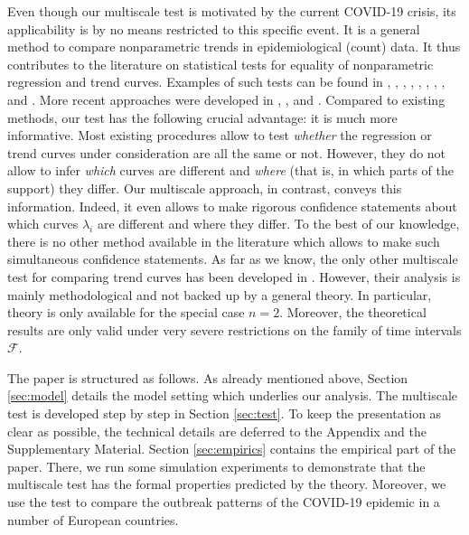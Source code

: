 \documentclass[a4paper,12pt]{article}
\numberwithin{equation}{section}
\begin{document}
Even though our multiscale test is motivated by the current COVID-19 crisis, its applicability is by no means restricted to this specific event. It is a general method to compare nonparametric trends in epidemiological (count) data. It thus contributes to the literature on statistical tests for equality of nonparametric regression and trend curves. Examples of such tests can be found in \cite{HaerdleMarron1990}, \cite{Hall1990}, \cite{King1991}, \cite{Delgado1993}, \cite{Kulasekera1995}, \cite{YoungBowman1995}, \cite{MunkDette1998}, \cite{Lavergne2001}, \cite{NeumeyerDette2003} and \cite{Pardo-Fernandez2007}. More recent approaches were developed in \cite{DegrasWu2012}, \cite{Zhang2012}, \cite{Hidalgo2014} and \cite{ChenWu2018}. Compared to existing methods, our test has the following crucial advantage: it is much more informative. Most existing procedures allow to test \textit{whether} the regression or trend curves under consideration are all the same or not. However, they do not allow to infer \textit{which} curves are different and \textit{where} (that is, in which parts of the support) they differ. Our multiscale approach, in contrast, conveys this information. Indeed, it even allows to make rigorous confidence statements about which curves $\lambda_i$ are different and where they differ. To the best of our knowledge, there is no other method available in the literature which allows to make such simultaneous confidence statements. As far as we know, the only other multiscale test for comparing trend curves has been developed in \cite{Park2009}. However, their analysis is mainly methodological and not backed up by a general theory. In particular, theory is only available for the special case $n = 2$. Moreover, the theoretical results are only valid under very severe restrictions on the family of time intervals $\mathcal{F}$. 


The paper is structured as follows. As already mentioned above, Section \ref{sec:model} details the model setting which underlies our analysis. The multiscale test is developed step by step in Section \ref{sec:test}. To keep the presentation as clear as possible, the technical details are deferred to the Appendix and the Supplementary Material. Section \ref{sec:empirics} contains the empirical part of the paper. There, we run some simulation experiments to demonstrate that the multiscale test has the formal properties predicted by the theory. Moreover, we use the test to compare the outbreak patterns of the COVID-19 epidemic in a number of European countries. 
\end{document}
